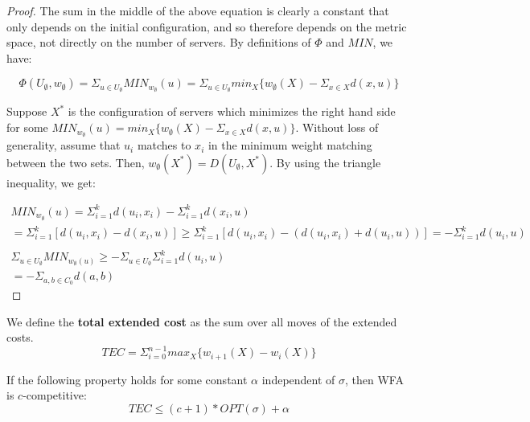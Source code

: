 \begin{proof}
    The sum in the middle of the above equation is clearly a constant that only depends on the initial configuration, and so therefore depends on the metric space, not directly on the number of servers. By definitions of $\Phi$ and $MIN$, we have:

    \begin{equation*}
        \Phi(U_\emptyset, w_\emptyset) = \Sigma_{u \in U_\emptyset} MIN_{w_\emptyset}(u) = \Sigma_{u \in U_\emptyset} min_X \{ w_\emptyset(X) - \Sigma_{x \in X} d(x, u)\}
    \end{equation*}

    Suppose $X^*$ is the configuration of servers which minimizes the right hand side for some $MIN_{w_\emptyset}(u) = min_X \{ w_\emptyset(X) - \Sigma_{x \in X} d(x, u)\}$. Without loss of generality, assume that $u_i$ matches to $x_i$ in the minimum weight matching between the two sets. Then, $w_\emptyset(X^*) = D(U_\emptyset, X^*)$. By using the triangle inequality, we get:

    \begin{equation*}
        \begin{gathered}
            MIN_{w_\emptyset}(u) = \Sigma_{i=1}^k d(u_i, x_i) - \Sigma_{i=1}^k d(x_i , u) \\
            = \Sigma_{i=1}^k [d(u_i, x_i) - d(x_i, u)] \geq \Sigma_{i=1}^k [d(u_i, x_i) - (d(u_i, x_i) + d(u_i, u))] = - \Sigma_{i=1}^k d(u_i, u) \\ \\
            \Sigma_{u \in U_\emptyset} MIN_{w_\emptyset(u)} \geq -\Sigma_{u \in U_\emptyset} \Sigma_{i=1}^k d(u_i, u) \\
            = - \Sigma_{a, b \in C_0} d(a, b)
        \end{gathered}
    \end{equation*}
\end{proof}

\begin{definition}
    We define the \textbf{total extended cost} as the sum over all moves of the extended costs. 
    \begin{equation*}
        TEC = \Sigma_{i = 0}^{n-1} max_X \{ w_{i+1} (X) - w_i(X)\}
    \end{equation*}
\end{definition}

\begin{lemma}
    If the following property holds for some constant $\alpha$ independent of $\sigma$, then WFA is $c$-competitive:
    \begin{equation*}
        TEC \leq (c+1) * OPT(\sigma) + \alpha
    \end{equation*}
\end{lemma}

